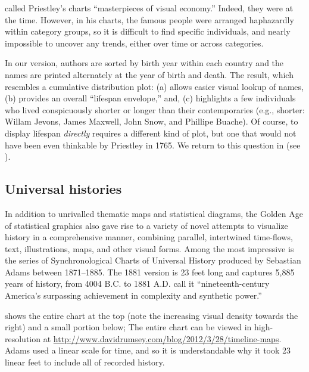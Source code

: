 \citet[p. 117]{RosenbergGrafton:2010} called Priestley's charts ``masterpieces of visual economy.'' Indeed, they were at the time.  However, in his charts, the famous people were arranged haphazardly within category groups, so it is difficult to find specific individuals, and nearly impossible to uncover any trends, either over time or across categories. 

In our version, authors are sorted by birth year within each country and the names are printed alternately at the year of birth and death. The result, which resembles a cumulative distribution plot: (a) allows easier visual lookup of names, (b) provides an overall ``lifespan envelope,'' and, (c) highlights a few individuals who lived conspicuously shorter or longer than their contemporaries (e.g., shorter: Willam Jevons,  James Maxwell, John Snow, and Phillipe Buache). Of course, to display lifespan \emph{directly} requires a different kind of plot, but one that would not have been even thinkable by Priestley in 1765.  We return to this question in  (see ).

\subsection{Universal histories}
In addition to unrivalled thematic maps and statistical diagrams, the Golden Age of statistical graphics also gave rise to a variety of novel attempts to visualize history in a comprehensive manner, combining parallel, intertwined time-flows, text, illustrations, maps, and other visual forms. Among the most impressive is the series of Synchronological Charts of Universal History produced by Sebastian Adams between 1871--1885. The 1881 version is 23 feet long and captures 5,885 years of history, from 4004 B.C. to 1881 A.D. \citet[p. 172]{RosenbergGrafton:2010} call it ``nineteenth-century America's surpassing achievement in complexity and synthetic power.'' 

 shows the entire chart at the top (note the increasing visual density towards the right) and a small portion below;
The entire chart can be viewed in high-resolution at \url{http://www.davidrumsey.com/blog/2012/3/28/timeline-maps}.  Adams used a linear scale for time, and so it is understandable why it took 23 linear feet to include all of recorded history.

